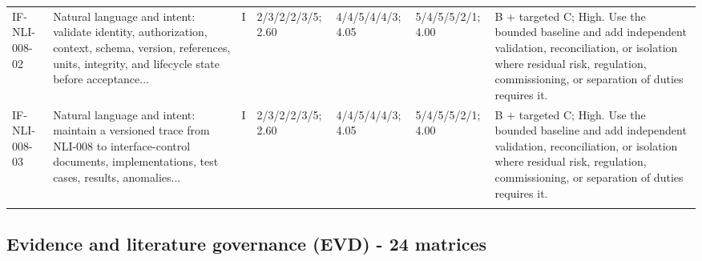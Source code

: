\documentclass[11pt,letterpaper]{article}
\begin{document}
\begin{scriptsize}
\begin{longtable}{@{}L{0.11\textwidth}L{0.165\textwidth}L{0.04\textwidth}L{0.115\textwidth}L{0.115\textwidth}L{0.115\textwidth}L{0.235\textwidth}@{}}
\addlinespace[2pt]
IF-NLI-008-02 & Natural language and intent: validate identity, authorization, context, schema, version, references, units, integrity, and lifecycle state before acceptance... & I & 2/3/2/2/3/5; 2.60 & 4/4/5/4/4/3; 4.05 & 5/4/5/5/2/1; 4.00 & B + targeted C; High. Use the bounded baseline and add independent validation, reconciliation, or isolation where residual risk, regulation, commissioning, or separation of duties requires it. \\
\addlinespace[2pt]
IF-NLI-008-03 & Natural language and intent: maintain a versioned trace from NLI-008 to interface-control documents, implementations, test cases, results, anomalies... & I & 2/3/2/2/3/5; 2.60 & 4/4/5/4/4/3; 4.05 & 5/4/5/5/2/1; 4.00 & B + targeted C; High. Use the bounded baseline and add independent validation, reconciliation, or isolation where residual risk, regulation, commissioning, or separation of duties requires it. \\
\addlinespace[2pt]
\end{longtable}
\end{scriptsize}

\subsection{Evidence and literature governance (EVD) - 24 matrices}
\end{document}
